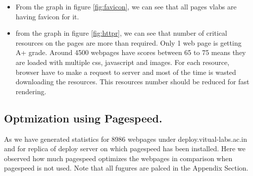 \documentclass[conference]{IEEEtran}
\begin{document}
\begin{itemize}
\item From the graph in figure \ref{fig:favicon}, we can see that all pages vlabs are having favicon for it.

\item from the graph in figure \ref{fig:httpr}, we can see that number of critical resources on the pages
are more than required. Only 1 web page is getting A+ grade. Around 4500 webpages
have scores between 65 to 75 means they are loaded with multiple css, javascript
and images. For each resource, browser have to make a request to server and most
of the time is wasted downloading the resources. This resources  number should be
reduced for fast rendering.
\end{itemize}


\subsection{Optmization using Pagespeed.}\label{sec-6.2}
As we have generated statistics for 8986 webpages under
deploy.vitual-labs.ac.in and for replica of deploy server on which pagespeed has
been installed. Here we observed how much pagespeed optimizes the webpages in comparison
when pagespeed is not used. Note that all fugures are palced in the Appendix Section.
\end{document}
